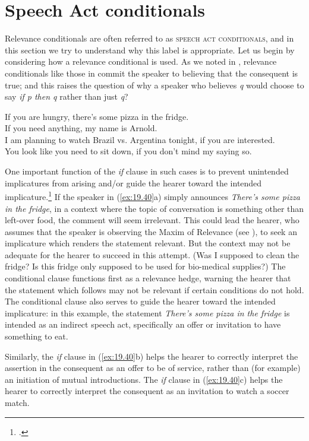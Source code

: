 \section{Speech Act conditionals}\label{sec:19.7}

Relevance conditionals are often referred to as \textsc{speech act conditionals}, and in this section we try to understand why this label is appropriate. Let us begin by considering how a relevance conditional is used. As we noted in , relevance conditionals like those in  commit the speaker to believing that the consequent is true; and this raises the question of why a speaker who believes \textit{q} would choose to say \textit{if p then q} rather than just \textit{q}?


\ea \label{ex:19.40}
\ea  If you are hungry, there’s some pizza in the fridge.\\
\ex If you need anything, my name is Arnold.\\
\ex I am planning to watch Brazil vs. Argentina tonight, if you are interested.\\
\ex You look like you need to sit down, if you don’t mind my saying so.
                       \z
\z


One important function of the \textit{if} clause in such cases is to prevent unintended implicatures from arising and/or guide the hearer toward the intended implicature.\footnote{\citet{DeRoseGrandy1999,Franke2007}.} If the speaker in (\ref{ex:19.40}a) simply announces \textit{There’s some pizza in the fridge}, in a context where the topic of conversation is something other than left-over food, the comment will seem irrelevant. This could lead the hearer, who assumes that the speaker is observing the Maxim of Relevance (see ), to seek an implicature which renders the statement relevant. But the context may not be adequate for the hearer to succeed in this attempt. (Was I supposed to clean the fridge? Is this fridge only supposed to be used for bio-medical supplies?) The conditional clause functions first as a relevance hedge, warning the hearer that the statement which follows may not be relevant if certain conditions do not hold. The conditional clause also serves to guide the hearer toward the intended implicature: in this example, the statement \textit{There’s some pizza in the fridge} is intended as an indirect speech act, specifically an offer or invitation to have something to eat.



Similarly, the \textit{if} clause in (\ref{ex:19.40}b) helps the hearer to correctly interpret the assertion in the consequent as an offer to be of service, rather than (for example) an initiation of mutual introductions. The \textit{if} clause in (\ref{ex:19.40}c) helps the hearer to correctly interpret the consequent as an invitation to watch a soccer match.



